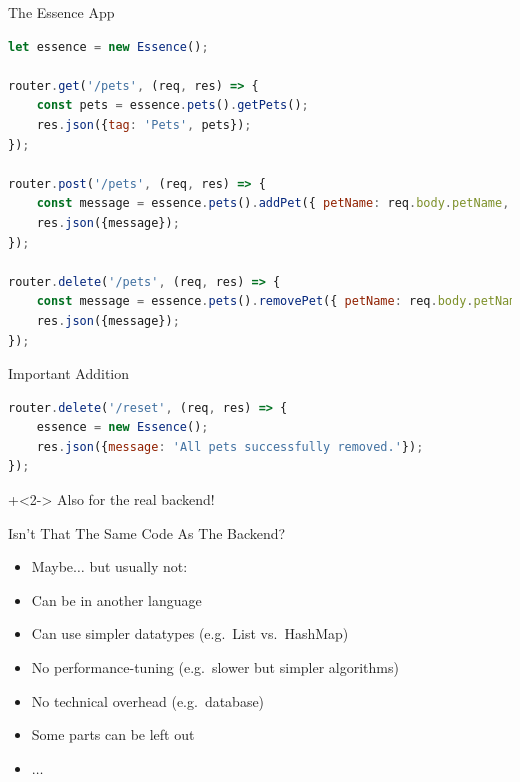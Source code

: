 \begin{frame}[fragile]{The Essence App}

\begin{lstlisting}[language=Javascript]
let essence = new Essence();

router.get('/pets', (req, res) => {
    const pets = essence.pets().getPets();
    res.json({tag: 'Pets', pets});
});

router.post('/pets', (req, res) => {
    const message = essence.pets().addPet({ petName: req.body.petName, petPrice: req.body.petPrice, petType: req.body.petType });
    res.json({message});
});

router.delete('/pets', (req, res) => {
    const message = essence.pets().removePet({ petName: req.body.petName, petPrice: req.body.petPrice, petType: req.body.petType });
    res.json({message});
});
\end{lstlisting}

\end{frame}


\begin{frame}[fragile]{Important Addition}

\begin{lstlisting}[language=Javascript]
router.delete('/reset', (req, res) => {
    essence = new Essence();
    res.json({message: 'All pets successfully removed.'});
});
\end{lstlisting}

\onslide+<2->
Also for the real backend!

\end{frame}


\begin{frame}[fragile]{Isn't That The Same Code As The Backend?}

\begin{itemize}
\item Maybe$\ldots$ but usually not:
\item Can be in another language
\item Can use simpler datatypes (e.g.~List vs.~HashMap)
\item No performance-tuning (e.g.~slower but simpler algorithms)
\item No technical overhead (e.g.~database)
\item Some parts can be left out
\item $\ldots$
\end{itemize}

\end{frame}


